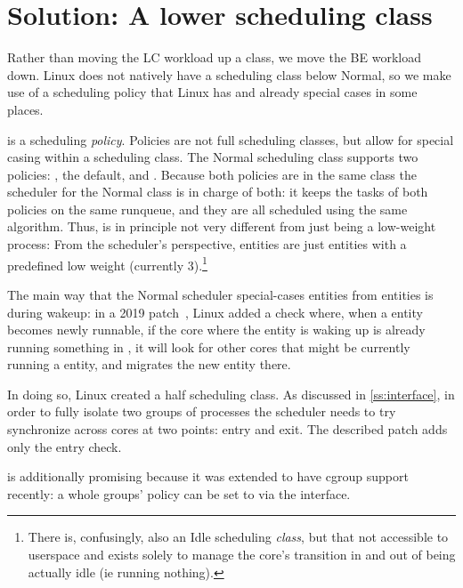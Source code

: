 
\section{Solution: A lower scheduling class}\label{s:idle}

Rather than moving the LC workload up a class, we move the BE workload down.
Linux does not natively have a scheduling class below Normal, so we make use of
a scheduling policy that Linux has and already special cases in some places.

\schedidle{} is a scheduling \textit{policy}. Policies are not full scheduling
classes, but allow for special casing within a scheduling class. The Normal
scheduling class supports two policies: \schednormal{}, the default, and
\schedidle{}. Because both policies are in the same class the scheduler for the
Normal class is in charge of both: it keeps the tasks of both policies on the
same runqueue, and they are all scheduled using the same algorithm. Thus,
\schedidle{} is in principle not very different from just being a low-weight
process: From the scheduler's perspective, \schedidle{} entities are just
entities with a predefined low weight (currently 3).\footnote{There is,
confusingly, also an Idle scheduling \textit{class}, but that not accessible to
userspace and exists solely to manage the core's transition in and out of being
actually idle (ie running nothing).}

The main way that the Normal scheduler special-cases \schedidle{} entities from
\schednormal{} entities is during wakeup: in a 2019 patch~\cite{TODO}, Linux
added a check where, when a \schednormal{} entity becomes newly runnable, if the
core where the entity is waking up is already running something in
\schednormal{}, it will look for other cores that might be currently running a
\schedidle{} entity, and migrates the new entity there.

In doing so, Linux created a half scheduling class. As discussed in
\autoref{ss:interface}, in order to fully isolate two groups of processes the
scheduler needs to try synchronize across cores at two points: entry and exit.
The described patch adds only the entry check.

\schedidle{} is additionally promising because it was extended to have cgroup
support recently\cite{TODO}: a whole groups' policy can be set to \schedidle{}
via the \cgroups{} interface.

